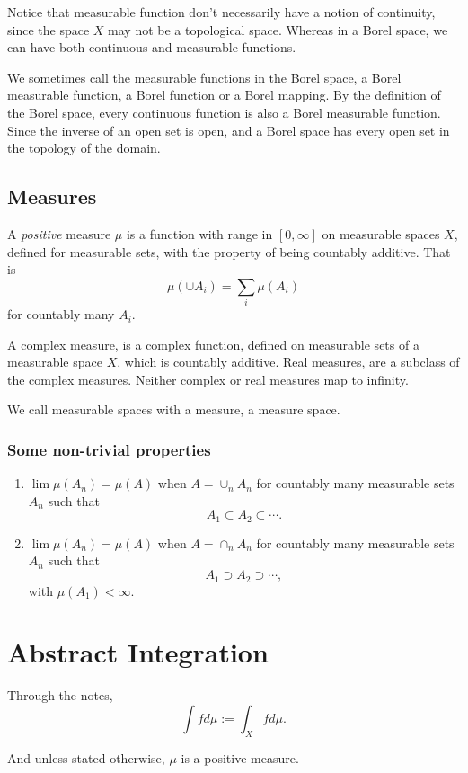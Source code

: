 \documentclass[oneside]{book}
\begin{document}
Notice that measurable function don't necessarily have a notion
of continuity, since the space $X$ may not be a topological 
space. Whereas in a Borel space, we can have both continuous
and measurable functions.

We sometimes call the measurable functions in the Borel space,
a Borel measurable function, a Borel function or a Borel mapping.
By the definition of the Borel space,
every continuous function is also a Borel measurable function.
Since the inverse of an open set is open, and a Borel space
has every open set in the topology of the domain.

\section{Measures}
A \emph{positive} measure $\mu$ is a function with range in
$[0,\infty]$ on measurable spaces $X$, defined for measurable 
sets, with the property of being countably additive. That is
$$\mu(\cup A_i)=\sum_i\mu(A_i)$$
for countably many $A_i$.

A complex measure, is a complex function, defined on measurable
sets of a measurable space $X$, which is countably additive.
Real measures, are a subclass of the complex measures.
Neither complex or real measures map to infinity.

We call measurable spaces with a measure, a measure space.

\subsection{Some non-trivial properties}
\begin{enumerate}
    \item $\lim \mu(A_n)=\mu(A)$ when $A=\cup_nA_n$ for countably
    many measurable sets $A_n$ such that
    $$A_1\subset A_2 \subset \cdots.$$
    \item $\lim \mu(A_n)=\mu(A)$ when $A=\cap_nA_n$ for countably
    many measurable sets $A_n$ such that
    $$A_1\supset A_2 \supset \cdots,$$
    with $\mu(A_1) < \infty$.
\end{enumerate}

\chapter{Abstract Integration}
Through the notes,
$$\int f d\mu := \int_X f d\mu.$$

And unless stated otherwise, $\mu$ is a positive measure.
\end{document}
